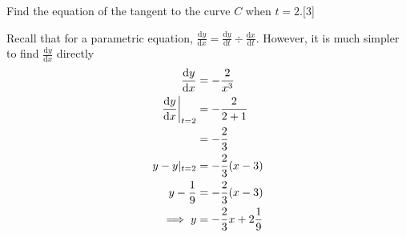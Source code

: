 \documentclass[12pt, a4 paper]{article}
\begin{document}
\begin{outline}[enumerate]
 \2 Find the equation of the tangent to the curve \(C\) when \(t=2\).\hfill[3]
 \begin{answer}
  Recall that for a parametric equation, \(\frac{\mathrm{d}y}{\mathrm{d}x}=\frac{\mathrm{d}y}{\mathrm{d}t}\div\frac{\mathrm{d}x}{\mathrm{d}t}\). However, it is much simpler to find \(\frac{\mathrm{d}y}{\mathrm{d}x}\) directly
  \begin{align*}
   \frac{\mathrm{d}y}{\mathrm{d}x}                    & = -\frac{2}{x^3}             \\
   \left.\frac{\mathrm{d}y}{\mathrm{d}x}\right|_{t=2} & = -\frac{2}{2+1}             \\
                                                      & = -\frac{2}{3}               \\\newline
   y-y|_{t=2}                                         & = -\frac{2}{3}(x-3)          \\
   y - \frac{1}{9}                                    & = -\frac{2}{3}(x-3)          \\
   \implies y                                         & = -\frac{2}{3}x+2\frac{1}{9}
  \end{align*}
 \end{answer}


\end{outline}
\end{document}
